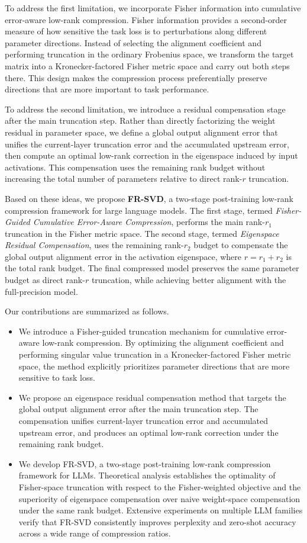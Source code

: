 \documentclass[a4paper,fleqn]{cas-dc}
\begin{document}
To address the first limitation, we incorporate Fisher information into cumulative error-aware low-rank compression. Fisher information provides a second-order measure of how sensitive the task loss is to perturbations along different parameter directions. Instead of selecting the alignment coefficient and performing truncation in the ordinary Frobenius space, we transform the target matrix into a Kronecker-factored Fisher metric space and carry out both steps there. This design makes the compression process preferentially preserve directions that are more important to task performance.

To address the second limitation, we introduce a residual compensation stage after the main truncation step. Rather than directly factorizing the weight residual in parameter space, we define a global output alignment error that unifies the current-layer truncation error and the accumulated upstream error, then compute an optimal low-rank correction in the eigenspace induced by input activations. This compensation uses the remaining rank budget without increasing the total number of parameters relative to direct rank-$r$ truncation.

Based on these ideas, we propose \textbf{FR-SVD}, a two-stage post-training low-rank compression framework for large language models. The first stage, termed \emph{Fisher-Guided Cumulative Error-Aware Compression}, performs the main rank-$r_1$ truncation in the Fisher metric space. The second stage, termed \emph{Eigenspace Residual Compensation}, uses the remaining rank-$r_2$ budget to compensate the global output alignment error in the activation eigenspace, where $r=r_1+r_2$ is the total rank budget. The final compressed model preserves the same parameter budget as direct rank-$r$ truncation, while achieving better alignment with the full-precision model.

Our contributions are summarized as follows.
\begin{itemize}[leftmargin=1.5em]
    \item We introduce a Fisher-guided truncation mechanism for cumulative error-aware low-rank compression. By optimizing the alignment coefficient and performing singular value truncation in a Kronecker-factored Fisher metric space, the method explicitly prioritizes parameter directions that are more sensitive to task loss.
    \item We propose an eigenspace residual compensation method that targets the global output alignment error after the main truncation step. The compensation unifies current-layer truncation error and accumulated upstream error, and produces an optimal low-rank correction under the remaining rank budget.
    \item We develop FR-SVD, a two-stage post-training low-rank compression framework for LLMs. Theoretical analysis establishes the optimality of Fisher-space truncation with respect to the Fisher-weighted objective and the superiority of eigenspace compensation over naive weight-space compensation under the same rank budget. Extensive experiments on multiple LLM families verify that FR-SVD consistently improves perplexity and zero-shot accuracy across a wide range of compression ratios.
\end{itemize}
\end{document}
